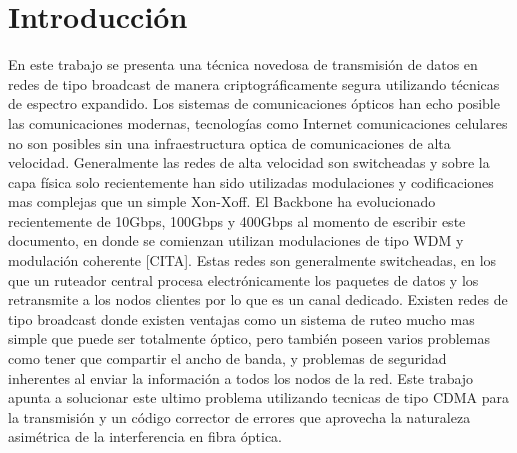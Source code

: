 \chapter{Introducción}

En este trabajo se presenta una técnica novedosa de transmisión de datos en redes de tipo broadcast de manera criptográficamente segura utilizando técnicas de espectro expandido.
Los sistemas de comunicaciones ópticos han echo posible las comunicaciones modernas, tecnologías como Internet comunicaciones celulares no son posibles sin una infraestructura optica de comunicaciones de alta velocidad.
Generalmente las redes de alta velocidad son switcheadas y sobre la capa física solo recientemente han sido utilizadas modulaciones y codificaciones mas complejas que un simple Xon-Xoff.
El Backbone ha evolucionado recientemente de 10Gbps, 100Gbps y 400Gbps al momento de escribir este documento, en donde se comienzan utilizan modulaciones de tipo WDM y modulación coherente [CITA]. Estas redes son generalmente switcheadas, en los que un ruteador central procesa electrónicamente los paquetes de datos y los retransmite a los nodos clientes por lo que es un canal dedicado.
Existen redes de tipo broadcast donde existen ventajas como un sistema de ruteo mucho mas simple que puede ser totalmente óptico, pero también poseen varios problemas como tener que compartir el ancho de banda, y problemas de seguridad inherentes al enviar la información a todos los nodos de la red. Este trabajo apunta a solucionar este ultimo problema utilizando tecnicas de tipo CDMA para la transmisión y un código corrector de errores que aprovecha la naturaleza asimétrica de la interferencia en fibra óptica.
